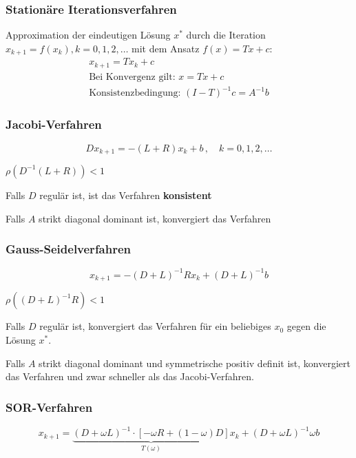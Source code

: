 		\subsubsection{Stationäre Iterationsverfahren}
			Approximation der eindeutigen Lösung $x^*$ durch die Iteration $x_{k+1} = f(x_k), k= 0, 1, 2, \dots$ mit dem Ansatz $f(x) = Tx + c$:
			\begin{gather*}
				x_{k+1} = T x_k + c \\
				\text{Bei Konvergenz gilt: } x = Tx + c \\
				\text{Konsistenzbedingung: } (I-T)^{-1}c = A^{-1}b
			\end{gather*}

		\subsubsection{Jacobi-Verfahren}
			\[
				Dx_{k+1} = -(L+R)x_k + b\,,\quad k = 0,1,2,\dots
			\]

			\begin{bedingung}
				$\rho(D^{-1}(L+R)) < 1$
			\end{bedingung}

			\begin{bemerkungen}
				\item Falls $D$ regulär ist, ist das Verfahren \textbf{konsistent}
				\item Falls $A$ strikt diagonal dominant ist, konvergiert das Verfahren
			\end{bemerkungen}

		\subsubsection{Gauss-Seidelverfahren}
			\[
				x_{k+1} = -(D+L)^{-1} R x_k + (D+L)^{-1}b
			\]

			\begin{bedingung}
				$\rho((D+L)^{-1}R)<1$
			\end{bedingung}

			\begin{bemerkungen}
				\item Falls $D$ regulär ist, konvergiert das Verfahren für ein beliebiges $x_0$ gegen die Lösung $x^*$.
				\item Falls $A$ strikt diagonal dominant und symmetrische positiv definit ist, konvergiert das Verfahren und zwar schneller als das Jacobi-Verfahren.
			\end{bemerkungen}

		\subsubsection{SOR-Verfahren}
			\[
				x_{k+1} = \underbrace{(D+\omega L)^{-1}\cdot[-\omega R + (1-\omega)D]}_{T(\omega)} x_k + (D+\omega L)^{-1}\omega b
			\]

